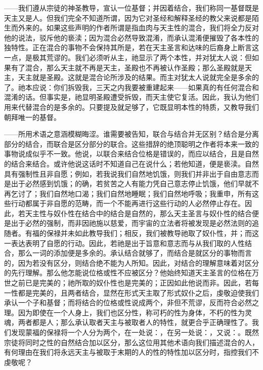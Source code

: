——我们遵从宗徒的神圣教导，宣认一位基督；并因着结合，我们称同一基督既是天主又是人。但我们完全不知道所谓，因为它对圣经和解释圣经的教父来说都是陌生而外来的。如果这些声明的作者所谓是指血肉与天主性的混合，我们将全力反对他的说法，驳斥他的亵渎；因为混合必然导致混淆，而承认混淆便摧毁了各本性的独特性。正在混合的事物不会保持其所是，若在天主圣言和达味的后裔身上断言这一点，是极其荒谬的。我们必须听从主，祂显示了两个本性，并对犹太人说：但如果有了混合，那么天主就不再是天主，圣殿也不再被认作圣殿；那么圣殿就是天主，天主就是圣殿。这就是混合论所涉及的结果。而主对犹太人说就完全是多余的了。祂本应说：你们拆毁我，三天之内我要被重建起来——如果真的有任何混合和混淆的话。但事实是，祂显明圣殿遭受拆毁，而天主使它复活。因此，我认为他们用来代替混合的是多余的。只要提及就足够了，它既显明本性的特质，又教导我们朝拜唯一的基督。\par

——所用术语之意涵模糊晦涩。谁需要被告知，联合与结合并无区别？结合是分离部分的结合，而联合是区分部分的联合。这些措辞的绝顶聪明之作者将本来一致的事物说成似乎不一致。他说，以联合来结合位格是错误的，而应以结合，且是自然的结合来结合。或许他说这话时不知道自己在说什么；若他知道，便是亵渎。自然具有强制性且非自愿；例如，若我说我们自然地饥饿，则我们并非出于自由意志而是出于必然感到饥饿；的确，若贫苦之人有能力凭自己意志停止饥饿，他们早就不再乞讨了；我们自然地口渴；我们自然地睡眠；我们自然地呼吸；我重申，所有这些行动都属于非自愿的范畴，而一个不能再进行这些行动的人必然停止存在。因此，若天主性与奴仆性在结合中的结合是自然的，那么天主圣言与奴仆性的结合便是出于必然的强制，而非因祂施以慈爱，而宇宙的立法者将被发现是必然法则的追随者。有福的保禄并未如此教导我们；相反，我们被教导祂取了奴仆性，并；而这一表达表明了自愿的行动。因此，若祂是出于旨意和意志而与从我们取的人性结合，那么一词的添加便是多余的。承认结合就够了，而结合是就区分的事物而言的，因为若没有区分，则结合绝不能为人所知。因此，对结合的理解意味着对区分的先行理解。那么他怎能说位格或性不应被区分？他始终知道天主圣言的位格在万世之前已是完美的；祂所取的奴仆性也是完美的；正因如此他说而非。因此，若每一性都是完美的，且两者结合，显然在形式天主取了形式奴仆之后，虔敬迫使我们承认一个子和基督；而将结合的位格或性说成两个，非但不荒谬，反而符合必然之理。因为即使在一个人身上，我们也区分性，称可朽的性为身体，不朽的性为灵魂，两者都是人；那么承认取者天主与被取者人的特性，就更合乎正确理性了。我们发现蒙福的保禄将一个人分为两个，在一处说：，在另一处说：，又说：。既然宗徒将同时之性的自然结合加以区分，那么这位用其他术语向我们描述混合的人，有何理由在我们将永远天主与被取于末期的人的性的特性加以区分时，指控我们不虔敬呢？\par

